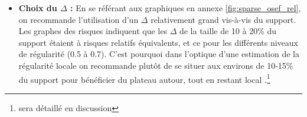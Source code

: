 \begin{itemize}
	\bigskip

	\item \textbf{Choix du $\Delta$ : } En se référant aux graphiques en annexe \ref{fig:sparse_osef_rel}, on recommande l'utilisation d'un $\Delta$ relativement grand vis-à-vis du support. Les graphes des risques indiquent que les $\Delta$ de la taille de 10 à 20\% du support étaient à risques relatifs équivalents, et ce pour les différents niveaux de régularité (0.5 à 0.7). C'est pourquoi dans l'optique d'une estimation de la régularité \og locale \fg on recommande plutôt de se situer aux environs de 10-15\% du support pour bénéficier du plateau autour, tout en restant \og local \fg.\footnote{sera détaillé en discussion}
\end{itemize}
